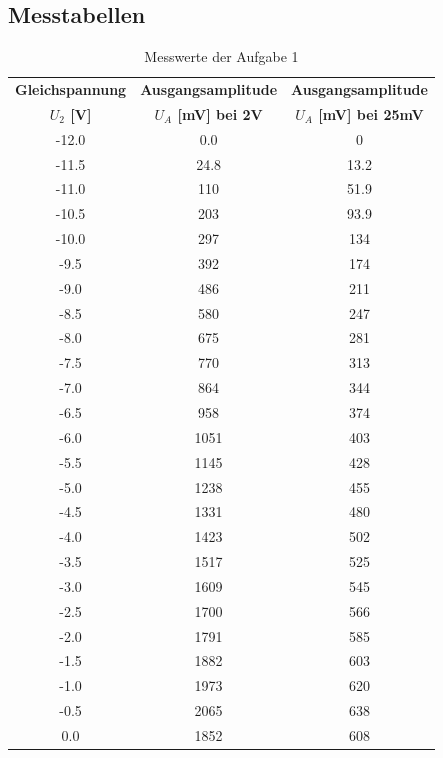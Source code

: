 \documentclass[12pt]{scrartcl}
\begin{document}
\subsection{Messtabellen}
\label{Ah:Messtabellen}
\begin{table}[!h] 
    \centering
    \begin{tabular}{|c|c|c|} 
\hline\textbf{Gleichspannung} & \textbf{Ausgangsamplitude} & \textbf{Ausgangsamplitude} \\
\textbf{$U_2$ [V]} & \textbf{$U_A$ [mV] bei 2V} & \textbf{$U_A$ [mV] bei 25mV} \\ \hline
            -12.0 & 0.0  & 0 \\ \hline 
            -11.5 & 24.8 & 13.2 \\ \hline
            -11.0 & 110  & 51.9 \\ \hline
            -10.5 & 203  & 93.9 \\ \hline
            -10.0 & 297  & 134 \\ \hline
            -9.5  & 392  & 174 \\ \hline
            -9.0  & 486  & 211 \\ \hline
            -8.5  & 580  & 247 \\ \hline
            -8.0  & 675  & 281 \\ \hline
            -7.5  & 770  & 313 \\ \hline
            -7.0  & 864  & 344 \\ \hline
            -6.5  & 958  & 374 \\ \hline
            -6.0  & 1051 & 403 \\ \hline
            -5.5  & 1145 & 428 \\ \hline
            -5.0  & 1238 & 455 \\ \hline
            -4.5  & 1331 & 480 \\ \hline
            -4.0  & 1423 & 502 \\ \hline
            -3.5  & 1517 & 525 \\ \hline
            -3.0  & 1609 & 545 \\ \hline
            -2.5  & 1700 & 566 \\ \hline
            -2.0  & 1791 & 585 \\ \hline
            -1.5  & 1882 & 603 \\ \hline
            -1.0  & 1973 & 620 \\ \hline
            -0.5  & 2065 & 638 \\ \hline
             0.0  & 1852 & 608 \\ \hline
    \end{tabular}
\caption{Messwerte der Aufgabe 1}\label{tab:Aufgabe1}
\end{table}
\end{document}
